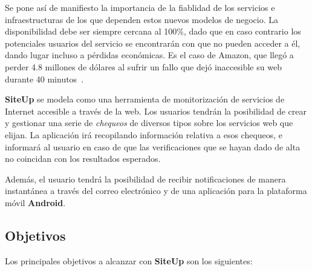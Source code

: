 \documentclass[a4paper,12pt]{article}
\begin{document}
Se pone así de manifiesto la importancia de la fiablidad de los servicios e
infraestructuras de los que dependen estos nuevos modelos de negocio. La
disponibilidad debe ser siempre cercana al 100\%, dado que en caso contrario los
potenciales usuarios del servicio se encontrarán con que no pueden acceder a él,
dando lugar incluso a pérdidas económicas. Es el caso de Amazon, que llegó a
perder 4.8 millones de dólares al sufrir un fallo que dejó inaccesible su web
durante 40 minutos~\cite{amazon}.

\textbf{SiteUp} se modela como una herramienta de monitorización de servicios de
Internet accesible a través de la web. Los usuarios tendrán la posibilidad de
crear y gestionar una serie de \textit{chequeos} de diversos tipos sobre los
servicios web que elijan. La aplicación irá recopilando información relativa a
esos chequeos, e informará al usuario en caso de que las verificaciones que se
hayan dado de alta no coincidan con los resultados esperados.

Además, el usuario tendrá la posibilidad de recibir notificaciones de manera
instantánea a través del correo electrónico y de una aplicación para la
plataforma móvil \textbf{Android}. 


\subsection{Objetivos}
Los principales objetivos a alcanzar con \textbf{SiteUp} son los siguientes:
\end{document}
